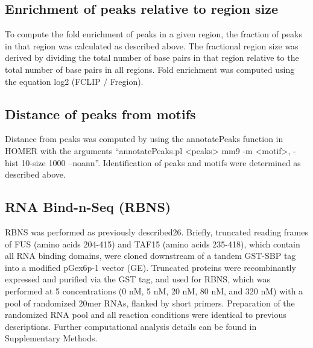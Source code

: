 \subsection{Enrichment of peaks relative to region size}
To compute the fold enrichment of peaks in a given region, the fraction of peaks in that region was calculated as described above. The fractional region size was derived by dividing the total number of base pairs in that region relative to the total number of base pairs in all regions. Fold enrichment was computed using the equation log2 (FCLIP / Fregion).

\subsection{Distance of peaks from motifs}
Distance from peaks was computed by using the annotatePeaks function in HOMER\cite{Heinz2010} with the arguments “annotatePeaks.pl <peaks> mm9 -m <motif>, -hist 10-size 1000 –noann”.  Identification of peaks and motifs were determined as described above.

\subsection{RNA Bind-n-Seq (RBNS)}
RBNS was performed as previously described26. Briefly, truncated reading frames of FUS (amino acids 204-415) and TAF15 (amino acids 235-418), which contain all RNA binding domains, were cloned downstream of a tandem GST-SBP tag into a modified pGex6p-1 vector (GE). Truncated proteins were recombinantly expressed and purified via the GST tag, and used for RBNS, which was performed at 5 concentrations (0 nM, 5 nM, 20 nM, 80 nM, and 320 nM) with a pool of randomized 20mer RNAs, flanked by short primers. Preparation of the randomized RNA pool and all reaction conditions were identical to previous descriptions\cite{Lambert2014}. Further computational analysis details can be found in Supplementary Methods.

